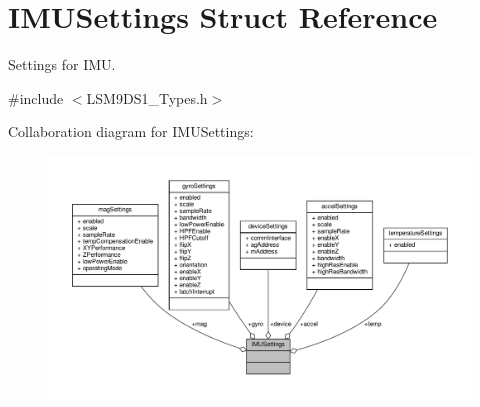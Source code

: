 \hypertarget{structIMUSettings}{}\section{I\+M\+U\+Settings Struct Reference}
\label{structIMUSettings}


Settings for I\+MU.  




{\ttfamily \#include $<$L\+S\+M9\+D\+S1\+\_\+\+Types.\+h$>$}



Collaboration diagram for I\+M\+U\+Settings\+:\nopagebreak
\begin{figure}[H]
\begin{center}
\leavevmode
\includegraphics[width=350pt]{structIMUSettings__coll__graph}
\end{center}
\end{figure}

